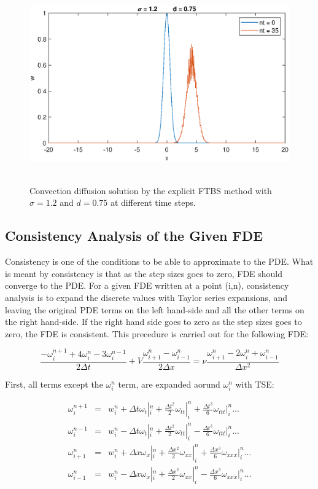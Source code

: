 \documentclass[letterpaper,12pt]{article}
\begin{document}
\begin{figure}[!ht] 
	\centering 
	\includegraphics[max height=8.5cm]{graphs/FTBS/ConvectionDiffusion/sigma12d075.eps}
	\caption{Convection diffusion solution by the explicit FTBS method with $\sigma= 1.2$ and $d=0.75$ at different time steps.}
	 \label{fig:FTBSsigma12d075}
\end{figure}


\newpage
\subsection{Consistency Analysis of the Given FDE}
Consistency is one of the conditions to be able to approximate to the PDE. What is meant by consistency is
that as the step sizes goes to zero, FDE should converge to the PDE. For a given FDE written at a point
(i,n), consistency analysis is to expand the discrete values with Taylor series expansions, and leaving
the original PDE terms on the left hand-side and all the other terms on the right hand-side. If the right
hand side goes to zero as the step sizes goes to zero, the FDE is consistent. This precedure is carried
out for the following FDE: 

\begin{equation}
	\frac{-\omega^{n+1}_{i}+4\omega^{n}_{i}-3\omega^{n-1}_{i}}{2\Delta t} + V\frac{\omega^{n}_{i+1}-\omega^{n}_{i-1}}{2\Delta x} = \nu\frac{\omega^{n}_{i+1}-2\omega^{n}_{i}+\omega^{n}_{i-1}}{\Delta x^2}
	\label{equation:q4}
\end{equation}

First, all terms except the $\omega^{n}_{i}$ term, are expanded aorund $\omega^{n}_{i}$ with TSE:

\begin{eqnarray}
	\omega^{n+1}_i &=& w^n_i + \Delta t \omega_t|^n_i + \frac{\Delta t^2}{2} \omega_{tt}|^n_i + \frac{\Delta t^3}{6} \omega_{ttt}|^n_i ... \nonumber \\
	\omega^{n-1}_i &=& w^n_i - \Delta t \omega_t|^n_i + \frac{\Delta t^2}{2} \omega_{tt}|^n_i - \frac{\Delta t^3}{6} \omega_{ttt}|^n_i ... \nonumber \\
	\omega^n_{i+1} &=& w^n_i + \Delta x \omega_x|^n_i + \frac{\Delta x^2}{2} \omega_{xx}|^n_i + \frac{\Delta x^3}{6} \omega_{xxx}|^n_i ... \nonumber \\
	\omega^n_{i-1} &=& w^n_i - \Delta x \omega_x|^n_i + \frac{\Delta x^2}{2} \omega_{xx}|^n_i - \frac{\Delta x^3}{6} \omega_{xxx}|^n_i ... 
\end{eqnarray}
\end{document}
